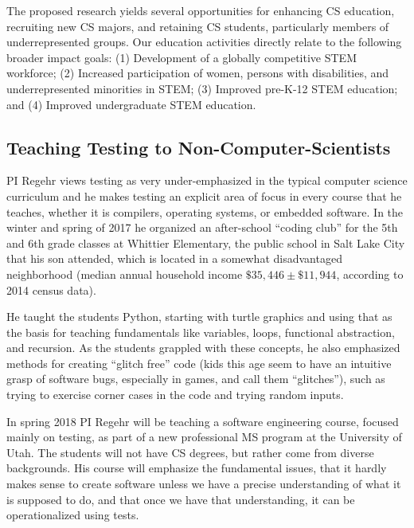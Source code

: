 
The proposed research yields several opportunities for enhancing CS
education, recruiting new CS majors, and retaining CS students,
particularly members of underrepresented groups. Our education
activities directly relate to the following broader impact goals: (1)
Development of a globally competitive STEM workforce; (2)
Increased participation of women, persons with disabilities, and underrepresented minorities in STEM;
(3) Improved pre-K-12 STEM education; and (4) Improved undergraduate STEM education.


\subsection{Teaching Testing to Non-Computer-Scientists}

PI Regehr views testing as very under-emphasized in the typical
computer science curriculum and he makes testing an explicit area of
focus in every course that he teaches, whether it is compilers,
operating systems, or embedded software.
%
In the winter and spring of 2017 he organized an after-school ``coding
club'' for the 5th and 6th grade classes at Whittier Elementary, the
public school in Salt Lake City that his son attended, which is
located in a somewhat disadvantaged neighborhood (median annual
household income $\$35,446\pm\$11,944$, according to 2014 census
data).


He taught the students Python, starting with turtle graphics and using
that as the basis for teaching fundamentals like variables,
loops, functional abstraction, and recursion.
%
As the students grappled with these concepts, he also emphasized
methods for creating ``glitch free'' code (kids this age seem to have
an intuitive grasp of software bugs, especially in games, and call
them ``glitches''), such as trying to exercise corner cases in the
code and trying random inputs.


In spring 2018 PI Regehr will be teaching a software engineering
course, focused mainly on testing, as part of a new professional MS
program at the University of Utah.
%
The students will not have CS degrees, but rather come from diverse
backgrounds.
%
His course will emphasize the fundamental issues, that it hardly makes
sense to create software unless we have a precise understanding of
what it is supposed to do, and that once we have that understanding,
it can be operationalized using tests.



